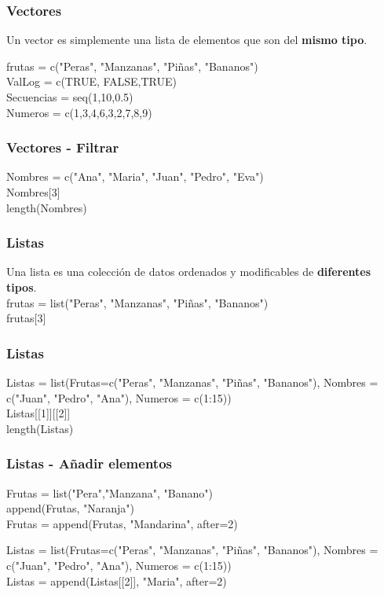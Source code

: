 \documentclass[14pt]{beamer}
\begin{document}
\begin{frame}
	\frametitle{Vectores}
	
	Un vector es simplemente una lista de elementos que son del \textbf{mismo tipo}.\\
	\vspace{0.5cm}
	
	frutas = c("Peras", "Manzanas", "Piñas", "Bananos")\\
	ValLog = c(TRUE, FALSE,TRUE)\\
	Secuencias = seq(1,10,0.5)\\
	Numeros = c(1,3,4,6,3,2,7,8,9)
	
\end{frame}

\begin{frame}
	\frametitle{Vectores - Filtrar}
	
	Nombres = c("Ana", "Maria", "Juan", "Pedro", "Eva")\\
	
	Nombres[3]\\
	length(Nombres)
	
	
\end{frame}

\begin{frame}
	\frametitle{Listas}
	Una lista es una colección de datos ordenados y modificables de \textbf{diferentes tipos}.\\
	\vspace{0.5cm}
	frutas = list("Peras", "Manzanas", "Piñas", "Bananos")\\
	frutas[3]
\end{frame}

\begin{frame}
	\frametitle{Listas}
	Listas = list(Frutas=c("Peras", "Manzanas", "Piñas", "Bananos"), Nombres = c("Juan", "Pedro", "Ana"), Numeros = c(1:15)) \\
	\vspace{0.5cm}
	Listas[[1]][[2]] \\
	length(Listas)
\end{frame}

\begin{frame}
	\frametitle{Listas - Añadir elementos}
	Frutas = list("Pera","Manzana", "Banano")\\
	append(Frutas, "Naranja")\\
	Frutas = append(Frutas, "Mandarina", after=2)
	\vspace{0.5cm}
	
	Listas = list(Frutas=c("Peras", "Manzanas", "Piñas", "Bananos"), Nombres = c("Juan", "Pedro", "Ana"), Numeros = c(1:15))\\
	
	Listas = append(Listas[[2]], "Maria", after=2)
	
\end{frame}
\end{document}
